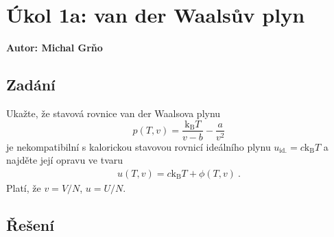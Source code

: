 \documentclass{article}
\newcommand{\const}[1]{\text{#1}}
\def\kB{\const{k}_\const{B}}
\begin{document}
\section*{Úkol 1a: van der Waalsův plyn}
\textbf{Autor: Michal Grňo}

\subsection*{Zadání}
Ukažte, že stavová rovnice van der Waalsova plynu
\begin{equation*}
    p(T, v) = \frac{\kB T}{v-b} - \frac{a}{v^2}
\end{equation*}
je nekompatibilní s kalorickou stavovou rovnicí ideálního plynu $u_\const{id.} = c \kB T$ a najděte její opravu ve tvaru
\begin{align*}
    u(T, v) = c \kB T + \phi(T, v) \: .
\end{align*}
Platí, že $v = V/N$, $u = U/N$.

\subsection*{Řešení}
\end{document}
